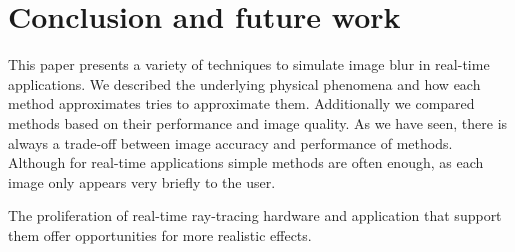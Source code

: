 \chapter{Conclusion and future work}
This paper presents a variety of techniques to simulate image blur in real-time applications.
We described the underlying physical phenomena and how each method approximates tries to approximate them.
Additionally we compared methods based on their performance and image quality.
As we have seen, there is always a trade-off between image accuracy and performance of methods.
Although for real-time applications simple methods are often enough, as each image only appears very briefly to the user.

The proliferation of real-time ray-tracing hardware and application that support them offer opportunities for more realistic effects.